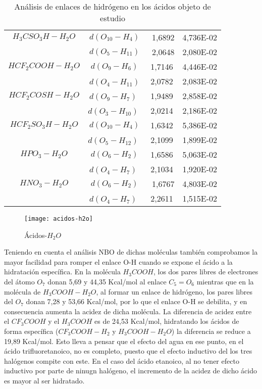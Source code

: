 \begin{table}[H]
\begin{tabular}{|c|c|c|c|}
 $H_3CSO_3H-H_2O$	& $d(O_{10}-H_4)$	&﻿ 1,6892	& 4,736E-02 \\ \cline{2-4}
	& $d(O_5-H_{11})$	&﻿ 2,0648 &	2,080E-02 \\ \hline
 $HCF_2COOH-H_2O$	& $d(O_9-H_6)$	&﻿1,7146	& 4,446E-02 \\ \cline{2-4}
	& $d(O_4-H_{11})$﻿ & 2,0782	& 2,083E-02 \\ \hline
 $HCF_2COSH-H_2O$	& $d(O_9-H_7)$	﻿&1,9489 & 2,858E-02 \\ \cline{2-4}
	& $d(O_3-H_{10})$	﻿& 2,0214 &	2,186E-02 \\ \hline
 $HCF_2SO_3H-H_2O$	& $d(O_{10}-H_4)$ &	﻿1,6342	& 5,386E-02 \\ \cline{2-4}
&	$d(O_5-H_{12})$	﻿& 2,1099	& 1,899E-02 \\ \hline
 $HPO_3-H_2O$	& $d(O_6-H_2)$ &	﻿1,6586	& 5,063E-02 \\ \cline{2-4}
	& $d(O_4-H_7)$	﻿& 2,1034	& 1,920E-02 \\ \hline
 $HNO_3-H_2O$	& $d(O_6-H_2)$	&﻿ 1,6767	& 4,803E-02 \\ \cline{2-4}
	& $d(O_4-H_7)$	﻿& 2,2611	& 1,515E-02 \\ \hline
	\end{tabular}
\caption{Análisis de enlaces de hidrógeno en los ácidos objeto de estudio}
\end{table}
\begin{figure}[H]
	\centering
	\texttt{[image: acidos-h2o]}
	\caption{Ácidos-$H_2O$}
\end{figure}
 Teniendo en cuenta el análisis NBO de dichas moléculas también comprobamos la mayor facilidad para romper el enlace O-H cuando se expone el ácido a la hidratación específica. En la molécula $H_3COOH$, los dos pares libres de electrones del átomo $O_7$ donan 5,69 y 44,35 Kcal/mol al enlace $C_5=O_6$ mientras que en la molécula de $H_3COOH-H_2O$, al formar un enlace de hidrógeno, los pares libres del $O_7$ donan 7,28 y 53,66 Kcal/mol, por lo que el enlace O-H se debilita, y en consecuencia aumenta la acidez de dicha molécula.
 La diferencia de acidez entre el $CF_3COOH$ y el $H_3COOH$ es de 24,53 Kcal/mol, hidratando los ácidos de forma específica ($CF_3COOH-H_2$ y $H_3COOH-H_2O$) la diferencia se reduce a 19,89 Kcal/mol. Esto lleva a pensar que el efecto del agua en ese punto, en el ácido trifluoretanoico, no es completo, puesto que el efecto inductivo del los tres halógenos compite con este. En el caso del ácido etanoico, al no tener efecto inductivo por parte de ninugn halógeno, el incremento de la acidez de dicho ácido es mayor al ser hidratado.
